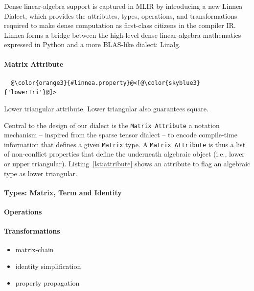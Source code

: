 \documentclass[conference]{IEEEtran}
\begin{document}
Dense linear-algebra support is captured in MLIR by introducing a new Linnea
Dialect, which provides the attributes, types, operations, and transformations
required to make dense computation as first-class citizens in the compiler IR.
Linnea forms a bridge between the high-level dense linear-algebra mathematics
expressed in Python and a more BLAS-like dialect: Linalg.

\paragraph{Matrix Attribute}

\begin{listing}[]
\begin{center}
\begin{minipage}[]{0.5\textwidth}
\begin{verbatim}
  @\color{orange3}{#linnea.property}@<[@\color{skyblue3}{'lowerTri'}@]>
\end{verbatim}
\end{minipage}
\caption{Lower triangular attribute. Lower triangular also guarantees square.}
\label{lst:attribute}
\end{center}
\end{listing}

Central to the design of our dialect is the \texttt{Matrix Attribute} a
notation mechanism -- inspired from the sparse tensor dialect -- to encode
compile-time information that defines a given \texttt{Matrix} type. A
\texttt{Matrix Attribute} is thus a list of non-conflict properties that define
the underneath algebraic object (i.e., lower or upper triangular). Listing~\ref{lst:attribute}
shows an attribute to flag an algebraic type as lower triangular.

\paragraph{Types: Matrix, Term and Identity}



\paragraph{Operations}
\paragraph{Transformations}
\begin{itemize}
  \item matrix-chain
  \item identity simplification
  \item property propagation
\end{itemize}
\end{document}
